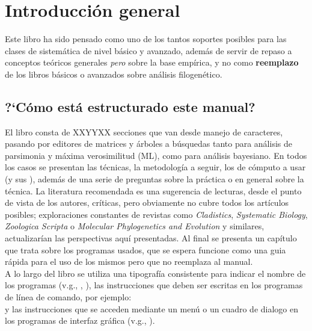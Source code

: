 \thispagestyle{empty}
\pagestyle{fancy}
\fancyhead{}
\fancyfoot{}
\renewcommand{\chaptername}{}
\fancyfoot[CE,CO]{\thepage}
\chapter{Introducci\'on general}
Este libro ha sido pensado como uno de los tantos soportes posibles para las clases de sistem\'atica de nivel b\'asico y avanzado, adem\'as de servir de repaso a conceptos te\'oricos generales \textit{pero} sobre la base emp\'irica, y no como \textbf{reemplazo} de los 
libros b\'asicos o avanzados sobre an\'alisis filogen\'etico.
\section*{?`C\'omo est\'a estructurado este manual?}
El libro consta de XXYYXX secciones que van desde manejo de caracteres, pasando por editores de matrices y \'arboles a b\'usquedas tanto para an\'alisis de parsimonia y m\'axima verosimilitud (ML), como para an\'alisis bayesiano. En todos los casos se presentan las t\'ecnicas, la metodolog\'ia a seguir, los  de c\'omputo a usar (y sus ), adem\'as de una serie de preguntas sobre la pr\'actica o en general sobre la t\'ecnica. La literatura recomendada es una sugerencia de lecturas, desde el punto de vista de los autores, cr\'iticas, pero obviamente no cubre todos los art\'iculos posibles; exploraciones constantes de revistas como \textit{Cladistics}, \textit{Systematic Biology}, \textit{Zoologica Scripta} o \textit{Molecular Phylogenetics and Evolution} y similares, actualizar\'ian las perspectivas aqu\'i presentadas. Al final se presenta un cap\'itulo que trata sobre los programas usados, que se espera funcione como una guia r\'apida para el uso de los mismos pero que no reemplaza al manual.\\
A lo largo del libro se utiliza una tipograf\'ia consistente para indicar el nombre de los programas (v.g., , ), las instrucciones que deben ser escritas en los programas de l\'inea de comando, por ejemplo: \\ 
y las instrucciones que se acceden mediante un men\'u o un cuadro de dialogo en los programas de interfaz gr\'afica (v.g., ).\\

